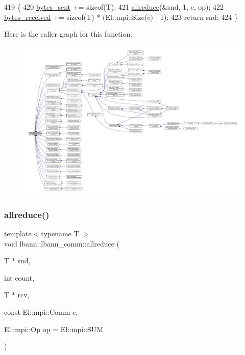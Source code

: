 \begin{DoxyCode}
419                                                                \{
420     \hyperlink{classlbann_1_1lbann__comm_ad1f146ae7337ece6266fd307944928e0}{bytes\_sent} += \textcolor{keyword}{sizeof}(T);
421     \hyperlink{classlbann_1_1lbann__comm_af5631e5f0f54e4df4958eba9df2599ef}{allreduce}(&snd, 1, c, op);
422     \hyperlink{classlbann_1_1lbann__comm_afb99f57f7eafc0695bf28e6c26a8120f}{bytes\_received} += \textcolor{keyword}{sizeof}(T) * (El::mpi::Size(c) - 1);
423     \textcolor{keywordflow}{return} snd;
424   \}
\end{DoxyCode}
Here is the caller graph for this function\+:\nopagebreak
\begin{figure}[H]
\begin{center}
\leavevmode
\includegraphics[width=350pt]{classlbann_1_1lbann__comm_af5631e5f0f54e4df4958eba9df2599ef_icgraph}
\end{center}
\end{figure}
\mbox{\label{classlbann_1_1lbann__comm_a12dd4f5476c54bdaf1ae2b348174b9fd}} 
\subsubsection{\texorpdfstring{allreduce()}{allreduce()}\hspace{0.1cm}{\footnotesize\ttfamily [2/4]}}
{\footnotesize\ttfamily template$<$typename T $>$ \\
void lbann\+::lbann\+\_\+comm\+::allreduce (\begin{DoxyParamCaption}\item[{T $\ast$}]{snd,  }\item[{int}]{count,  }\item[{T $\ast$}]{rcv,  }\item[{const El\+::mpi\+::\+Comm}]{c,  }\item[{El\+::mpi\+::\+Op}]{op = {\ttfamily El\+:\+:mpi\+:\+:SUM} }\end{DoxyParamCaption})\hspace{0.3cm}{\ttfamily [inline]}}

